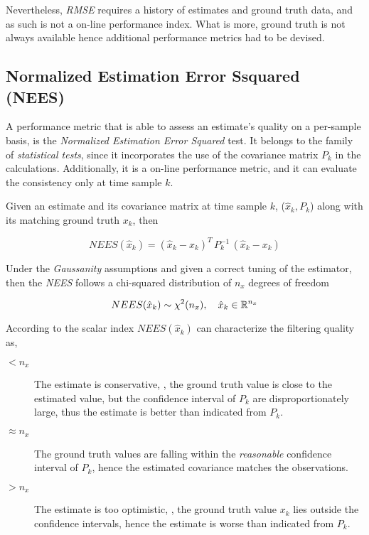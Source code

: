 Nevertheless, \emph{RMSE} requires a history of estimates and ground truth data, and as such is not a on-line performance index. What is more,  ground truth is not always available hence additional performance metrics had to be devised. 

\subsection{Normalized Estimation Error Ssquared (NEES)}
\label{ssec:NEES}
A performance metric that is able to assess an estimate's quality on a per-sample basis, is the \emph{Normalized Estimation Error Squared} test. It belongs to the family of \emph{statistical tests}, since it incorporates the use of the covariance matrix $P_k$ in the calculations. Additionally, it is a on-line performance metric, and it can evaluate the consistency only at time sample $k$.

\begin{framed}
Given an estimate and its covariance matrix at time sample $k$, ($\hat{x}_k, P_k$) along with its matching ground truth $x_k$, then

\begin{equation}\label{eq:NEES}
NEES(\hat{x}_k) =  (\hat{x}_k - x_k)^T \, P_k^{-1} \, (\hat{x}_k - x_k) 
\end{equation}

\end{framed}

Under the \emph{Gaussanity} assumptions and given a correct tuning of the estimator, then the \emph{NEES} follows a chi-squared distribution of $n_x$  degrees of freedom

\begin{equation}\label{key}
NEES(\hat{x}_k) \sim \chi^2(n_x), \quad \hat{x}_k \in {\mathbb{R}}^{n_x}
\end{equation}

According to \cite{TargetTracking} the scalar index $NEES(\hat{x}_k)$ can characterize the filtering quality as,

\begin{description}
	\item[$< n_x$] The estimate is conservative, \ie, the ground truth value is close to the estimated value, but the confidence interval of $P_k$ are disproportionately large, thus the estimate is better than indicated from $P_k$.
	\item[$ \approx n_x $] The ground truth values are falling within the \emph{reasonable} confidence interval of $P_k$, hence the estimated covariance matches the observations.
	\item[$> n_x$] The estimate is too optimistic, \ie, the ground truth value $x_k$ lies outside the confidence intervals, hence the estimate is worse than indicated from $P_k$.
\end{description}

